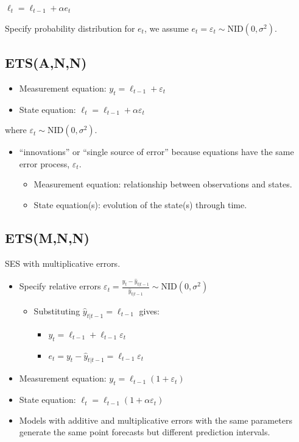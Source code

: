 \documentclass[]{book}
\providecommand{\tightlist}{%
  \setlength{\itemsep}{0pt}\setlength{\parskip}{0pt}}
\begin{document}
\(\ell_{t}=\ell_{t-1}+\alpha e_{t}\)

Specify probability distribution for \(e_t\), we assume \(e_t = \varepsilon_t\sim\text{NID}(0,\sigma^2)\).

\hypertarget{etsann}{%
\subsection{ETS(A,N,N)}\label{etsann}}

\begin{itemize}
\item
  Measurement equation: \(y_t = \ell_{t-1} + \varepsilon_t\)
\item
  State equation: \(\ell_t=\ell_{t-1}+\alpha \varepsilon_t\)
\end{itemize}

where \(\varepsilon_t\sim\text{NID}(0,\sigma^2)\).

\begin{itemize}
\tightlist
\item
  ``innovations'' or ``single source of error'' because equations have the same error process, \(\varepsilon_t\).

  \begin{itemize}
  \tightlist
  \item
    Measurement equation: relationship between observations and states.
  \item
    State equation(s): evolution of the state(s) through time.
  \end{itemize}
\end{itemize}

\hypertarget{etsmnn}{%
\subsection{ETS(M,N,N)}\label{etsmnn}}

SES with multiplicative errors.

\begin{itemize}
\item
  Specify relative errors \(\varepsilon_t=\frac{y_t-\hat{y}_{t|t-1}}{\hat{y}_{t|t-1}}\sim \text{NID}(0,\sigma^2)\)

  \begin{itemize}
  \tightlist
  \item
    Substituting \(\hat{y}_{t|t-1}=\ell_{t-1}\) gives:

    \begin{itemize}
    \tightlist
    \item
      \(y_t = \ell_{t-1}+\ell_{t-1}\varepsilon_t\)
    \item
      \(e_t = y_t - \hat{y}_{t|t-1} = \ell_{t-1}\varepsilon_t\)
    \end{itemize}
  \end{itemize}
\item
  Measurement equation: \(y_t = \ell_{t-1}(1 + \varepsilon_t)\)
\item
  State equation: \(\ell_t=\ell_{t-1}(1+\alpha \varepsilon_t)\)
\item
  Models with additive and multiplicative errors with the same parameters generate the same point forecasts but different prediction intervals.
\end{itemize}
\end{document}
